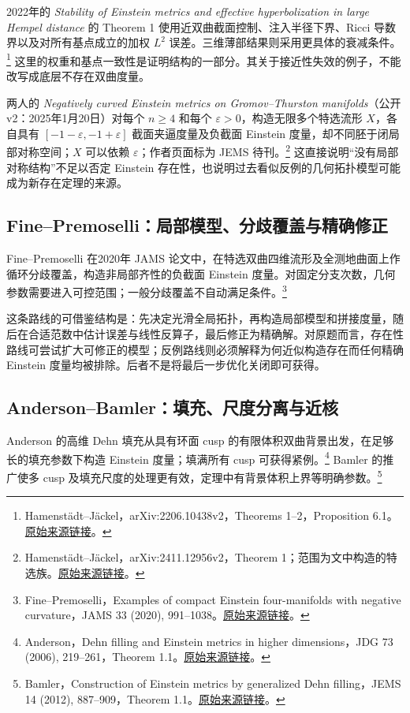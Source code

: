 \documentclass[11pt,a4paper]{article}
\theoremstyle{definition}
\newcommand{\src}[3]{\footnote{\raggedright #1，#2。\href{#3}{原始来源链接}。}}
\begin{document}
2022年的 \emph{Stability of Einstein metrics and effective hyperbolization in large Hempel distance} 的 Theorem 1 使用近双曲截面控制、注入半径下界、Ricci 导数界以及对所有基点成立的加权 $L^2$ 误差。三维薄部结果则采用更具体的衰减条件。\src{Hamenstädt--Jäckel}{arXiv:2206.10438v2，Theorems 1--2，Proposition 6.1}{https://arxiv.org/abs/2206.10438v2}
这里的权重和基点一致性是证明结构的一部分。其关于接近性失效的例子，不能改写成底层不存在双曲度量。

两人的 \emph{Negatively curved Einstein metrics on Gromov--Thurston manifolds}（公开 v2：2025年1月20日）对每个 $n\ge4$ 和每个 $\varepsilon>0$，构造无限多个特选流形 $X$，各自具有 $[-1-\varepsilon,-1+\varepsilon]$ 截面夹逼度量及负截面 Einstein 度量，却不同胚于闭局部对称空间；$X$ 可以依赖 $\varepsilon$；作者页面标为 JEMS 待刊。\src{Hamenstädt--Jäckel}{arXiv:2411.12956v2，Theorem 1；范围为文中构造的特选族}{https://arxiv.org/html/2411.12956v2}
这直接说明“没有局部对称结构”不足以否定 Einstein 存在性，也说明过去看似反例的几何拓扑模型可能成为新存在定理的来源。

\subsection{Fine--Premoselli：局部模型、分歧覆盖与精确修正}

Fine--Premoselli 在2020年 JAMS 论文中，在特选双曲四维流形及全测地曲面上作循环分歧覆盖，构造非局部齐性的负截面 Einstein 度量。对固定分支次数，几何参数需要进入可控范围；一般分歧覆盖不自动满足条件。\src{Fine--Premoselli}{Examples of compact Einstein four-manifolds with negative curvature，JAMS 33 (2020), 991--1038}{https://arxiv.org/abs/1802.00608}

这条路线的可借鉴结构是：先决定光滑全局拓扑，再构造局部模型和拼接度量，随后在合适范数中估计误差与线性反算子，最后修正为精确解。对原题而言，存在性路线可尝试扩大可修正的模型；反例路线则必须解释为何近似构造存在而任何精确 Einstein 度量均被排除。后者不是将最后一步优化关闭即可获得。

\subsection{Anderson--Bamler：填充、尺度分离与近核}

Anderson 的高维 Dehn 填充从具有环面 cusp 的有限体积双曲背景出发，在足够长的填充参数下构造 Einstein 度量；填满所有 cusp 可获得紧例。\src{Anderson}{Dehn filling and Einstein metrics in higher dimensions，JDG 73 (2006), 219--261，Theorem 1.1}{https://www.math.stonybrook.edu/~anderson/dehn.pdf}
Bamler 的推广使多 cusp 及填充尺度的处理更有效，定理中有背景体积上界等明确参数。\src{Bamler}{Construction of Einstein metrics by generalized Dehn filling，JEMS 14 (2012), 887--909，Theorem 1.1}{https://arxiv.org/abs/0911.4730v2}
\end{document}
